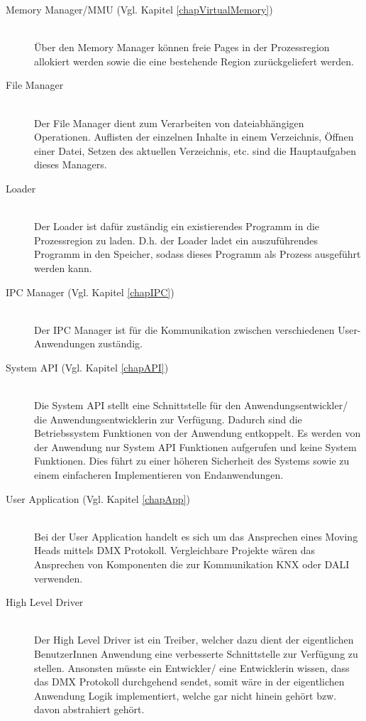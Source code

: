 \begin{description}
	\item[Memory Manager/MMU (Vgl. Kapitel \ref{chapVirtualMemory})] \hfill \\
	Über den Memory Manager können freie Pages in der Prozessregion allokiert werden sowie die eine bestehende Region zurückgeliefert werden.

	\item[File Manager] \hfill \\
	Der File Manager dient zum Verarbeiten von dateiabhängigen Operationen. Auflisten der einzelnen Inhalte in einem Verzeichnis, Öffnen einer Datei, Setzen des aktuellen Verzeichnis, etc. sind die Hauptaufgaben dieses Managers.
	
	\item[Loader] \hfill \\
	Der Loader ist dafür zuständig ein existierendes Programm in die Prozessregion zu laden. D.h. der Loader ladet ein auszuführendes Programm in den Speicher, sodass dieses Programm als Prozess ausgeführt werden kann.
	
	\item[IPC Manager (Vgl. Kapitel \ref{chapIPC})] \hfill \\
	Der IPC Manager ist für die Kommunikation zwischen verschiedenen User-Anwendungen zuständig.
	
	\item[System API (Vgl. Kapitel \ref{chapAPI})] \hfill \\
	Die System API stellt eine Schnittstelle für den Anwendungsentwickler/ die Anwendungsentwicklerin zur Verfügung. Dadurch sind die Betriebssystem Funktionen von der Anwendung entkoppelt. Es werden von der Anwendung nur System API Funktionen aufgerufen und keine System Funktionen. Dies führt zu einer höheren Sicherheit des Systems sowie zu einem einfacheren Implementieren von Endanwendungen.
	
	\item[User Application (Vgl. Kapitel \ref{chapApp})] \hfill \\
	Bei der User Application handelt es sich um das Ansprechen eines Moving Heads mittels DMX Protokoll. Vergleichbare Projekte wären das Ansprechen von Komponenten die zur Kommunikation KNX oder DALI verwenden.
	
	\item[High Level Driver] \hfill \\
	Der High Level Driver ist ein Treiber, welcher dazu dient der eigentlichen BenutzerInnen Anwendung eine verbesserte Schnittstelle zur Verfügung zu stellen. Ansonsten müsste ein Entwickler/ eine Entwicklerin wissen, dass das DMX Protokoll durchgehend sendet, somit wäre in der eigentlichen Anwendung Logik implementiert, welche gar nicht hinein gehört bzw. davon abstrahiert gehört.
\end{description}

\pagebreak 